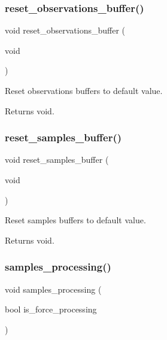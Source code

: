 \subsubsection{\texorpdfstring{reset\+\_\+observations\+\_\+buffer()}{reset\_observations\_buffer()}}
{\footnotesize\ttfamily void reset\+\_\+observations\+\_\+buffer (\begin{DoxyParamCaption}\item[{void}]{ }\end{DoxyParamCaption})}



Reset observations buffers to default value. 

\begin{DoxyReturn}{Returns}
void. 
\end{DoxyReturn}
\mbox{\label{i2c-th_8h_a5f6b7d25ff64c2ddaa0fadd3058fcee3}} 
\subsubsection{\texorpdfstring{reset\+\_\+samples\+\_\+buffer()}{reset\_samples\_buffer()}}
{\footnotesize\ttfamily void reset\+\_\+samples\+\_\+buffer (\begin{DoxyParamCaption}\item[{void}]{ }\end{DoxyParamCaption})}



Reset samples buffers to default value. 

\begin{DoxyReturn}{Returns}
void. 
\end{DoxyReturn}
\mbox{\label{i2c-th_8h_aba0fc91d6c2829df00a9d5fe2b921c90}} 
\subsubsection{\texorpdfstring{samples\+\_\+processing()}{samples\_processing()}}
{\footnotesize\ttfamily void samples\+\_\+processing (\begin{DoxyParamCaption}\item[{bool}]{is\+\_\+force\+\_\+processing }\end{DoxyParamCaption})}




